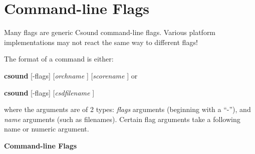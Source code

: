 \begin{comment}
\documentclass[10pt]{article}
\usepackage{fullpage, graphicx, url}
\setlength{\parskip}{1ex}
\setlength{\parindent}{0ex}
\title{Command-line Flags}



\begin{tabular}{ccc}
The Alternative Csound Reference Manual & & \\
Previous &The Csound Command &Next

\end{tabular}

\end{comment}
\section{Command-line Flags}


  Many flags are generic Csound command-line flags. Various platform implementations may not react the same way to different flags! 


  The format of a command is either: 


 \textbf{csound}
 [-flags] [\emph{orchname}
] [\emph{scorename}
]
 or 

 \textbf{csound}
 [-flags] [\emph{csdfilename}
]


  where the arguments are of 2 types: \emph{flags}
 arguments (beginning with a ``-''), and \emph{name}
 arguments (such as filenames). Certain flag arguments take a following name or numeric argument. 


 


 \textbf{Command-line Flags}

